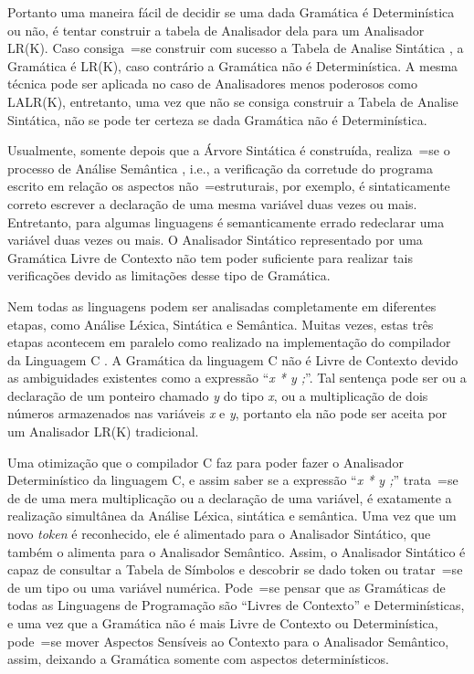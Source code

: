 {    Portanto uma maneira fácil de decidir se uma dada Gramática é Determinística ou não,
    é tentar construir a tabela de Analisador dela para um Analisador LR(K).
    Caso consiga~=se construir com sucesso a Tabela de Analise Sintática \cite{ahoCompilerDragonBook},
    a Gramática é LR(K),
    caso contrário a Gramática não é Determinística.
    A mesma técnica pode ser aplicada no caso de Analisadores menos poderosos como LALR(K),
    entretanto,
    uma vez que não se consiga construir a Tabela de Analise Sintática,
    não se pode ter certeza se dada Gramática não é Determinística.

    Usualmente,
    somente depois que a Árvore Sintática é construída,
    realiza~=se o processo de Análise Semântica \cite{ahoCompilerDragonBook},
    i.e.,
    a verificação da corretude do programa escrito em relação os aspectos não~=estruturais,
    por exemplo,
    é sintaticamente correto escrever a declaração de uma mesma variável duas vezes ou mais.
    Entretanto,
    para algumas linguagens é semanticamente errado redeclarar uma variável duas vezes ou mais.
    O Analisador Sintático representado por uma Gramática Livre de Contexto não tem poder
    suficiente para realizar tais verificações devido as limitações desse tipo de Gramática.

    Nem todas as linguagens podem ser analisadas completamente em diferentes etapas,
    como Análise Léxica, Sintática e Semântica. Muitas vezes,
    estas três etapas acontecem em paralelo como realizado na implementação do
    compilador da Linguagem C \cite{jourdan2017,whyCcannotBeParsedWithALR1Parser}.
    A Gramática da linguagem C não é Livre de Contexto devido as
    ambiguidades existentes como a expressão ``\textit{x * y ;}''.
    Tal sentença pode ser ou a declaração de um ponteiro chamado \textit{y} do tipo \textit{x},
    ou a multiplicação de dois números armazenados nas variáveis \textit{x} e
    \textit{y},
    portanto ela não pode ser aceita por um Analisador LR(K) tradicional.

    Uma otimização que o compilador C faz para poder fazer
    o Analisador Determinístico da linguagem C,
    e assim saber se a expressão ``\textit{x * y ;}'' trata~=se de
    de uma mera multiplicação ou a declaração de uma variável,
    é exatamente a realização simultânea da Análise Léxica,
    sintática e
    semântica.
    Uma vez que um novo \textit{token} é reconhecido,
    ele é alimentado para o Analisador Sintático,
    que também o alimenta para o Analisador Semântico.
    Assim,
    o Analisador Sintático é capaz de consultar a Tabela de Símbolos \cite{ahoCompilerDragonBook} e
    descobrir se dado token ou tratar~=se de um tipo ou uma variável numérica.
    Pode~=se pensar que as Gramáticas de todas as Linguagens
    de Programação são ``Livres de Contexto'' e
    Determinísticas,
    e uma vez que a Gramática não é mais Livre de Contexto ou Determinística,
    pode~=se mover Aspectos Sensíveis ao Contexto para o Analisador Semântico,
    assim,
    deixando a Gramática somente com aspectos determinísticos.

}
